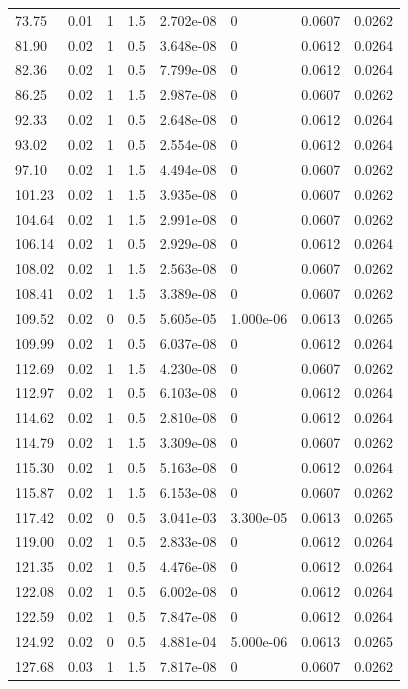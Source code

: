 \documentclass[preview]{standalone}
\begin{document}
{{\begin{tabular}{L{1.2cm}C{1.2cm} C{0.3cm}C{0.5cm} C{1.4cm}C{1.4cm} C{1.4cm}C{1.4cm}}
  73.75  &  0.01  & 1     & 1.5 &  2.702e-08  & 0  & 0.0607 &  0.0262   \\ 
  81.90  &  0.02  & 1     & 0.5 &  3.648e-08  & 0  & 0.0612 &  0.0264   \\ 
  82.36  &  0.02  & 1     & 0.5 &  7.799e-08  & 0  & 0.0612 &  0.0264   \\ 
  86.25  &  0.02  & 1     & 1.5 &  2.987e-08  & 0  & 0.0607 &  0.0262   \\ 
  92.33  &  0.02  & 1     & 0.5 &  2.648e-08  & 0  & 0.0612 &  0.0264   \\ 
  93.02  &  0.02  & 1     & 0.5 &  2.554e-08  & 0  & 0.0612 &  0.0264   \\ 
  97.10  &  0.02  & 1     & 1.5 &  4.494e-08  & 0  & 0.0607 &  0.0262   \\ 
  101.23  &  0.02  & 1     & 1.5 &  3.935e-08  & 0  & 0.0607 &  0.0262   \\ 
  104.64  &  0.02  & 1     & 1.5 &  2.991e-08  & 0  & 0.0607 &  0.0262   \\ 
  106.14  &  0.02  & 1     & 0.5 &  2.929e-08  & 0  & 0.0612 &  0.0264   \\ 
  108.02  &  0.02  & 1     & 1.5 &  2.563e-08  & 0  & 0.0607 &  0.0262   \\ 
  108.41  &  0.02  & 1     & 1.5 &  3.389e-08  & 0  & 0.0607 &  0.0262   \\ 
  109.52  &  0.02  & 0     & 0.5 &  5.605e-05  & 1.000e-06  & 0.0613 &  0.0265   \\ 
  109.99  &  0.02  & 1     & 0.5 &  6.037e-08  & 0  & 0.0612 &  0.0264   \\ 
  112.69  &  0.02  & 1     & 1.5 &  4.230e-08  & 0  & 0.0607 &  0.0262   \\ 
  112.97  &  0.02  & 1     & 0.5 &  6.103e-08  & 0  & 0.0612 &  0.0264   \\ 
  114.62  &  0.02  & 1     & 0.5 &  2.810e-08  & 0  & 0.0612 &  0.0264   \\ 
  114.79  &  0.02  & 1     & 1.5 &  3.309e-08  & 0  & 0.0607 &  0.0262   \\ 
  115.30  &  0.02  & 1     & 0.5 &  5.163e-08  & 0  & 0.0612 &  0.0264   \\ 
  115.87  &  0.02  & 1     & 1.5 &  6.153e-08  & 0  & 0.0607 &  0.0262   \\ 
  117.42  &  0.02  & 0     & 0.5 &  3.041e-03  & 3.300e-05  & 0.0613 &  0.0265   \\ 
  119.00  &  0.02  & 1     & 0.5 &  2.833e-08  & 0  & 0.0612 &  0.0264   \\ 
  121.35  &  0.02  & 1     & 0.5 &  4.476e-08  & 0  & 0.0612 &  0.0264   \\ 
  122.08  &  0.02  & 1     & 0.5 &  6.002e-08  & 0  & 0.0612 &  0.0264   \\ 
  122.59  &  0.02  & 1     & 0.5 &  7.847e-08  & 0  & 0.0612 &  0.0264   \\ 
  124.92  &  0.02  & 0     & 0.5 &  4.881e-04  & 5.000e-06  & 0.0613 &  0.0265   \\ 
  127.68  &  0.03  & 1     & 1.5 &  7.817e-08  & 0  & 0.0607 &  0.0262   \\ 
\hline 
\end{tabular} 

}}
\end{document}
